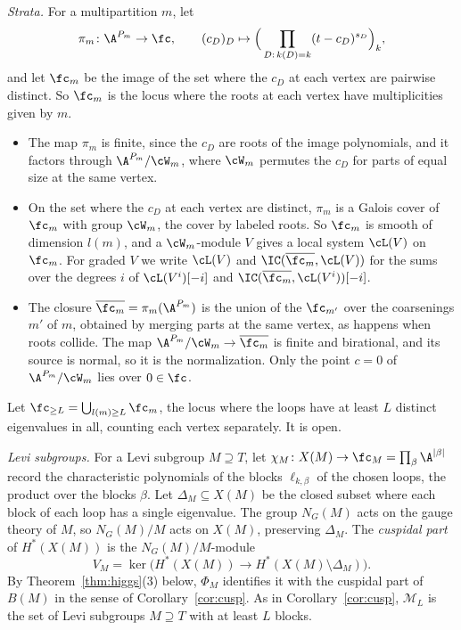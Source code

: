 \documentclass[11pt]{amsart}
\begin{document}
\emph{Strata.}  For a multipartition $m$, let
\[
 \pi_m\colon\A^{P_m}\to\fc,\qquad(c_D)_D\mapsto\Big(\prod_{D:\,k(D)=k}(t-c_D)^{s_D}\Big)_k ,
\]
and let $\fc_m$ be the image of the set where the $c_D$ at each vertex are
pairwise distinct.  So $\fc_m$ is the locus where the roots at each vertex
have multiplicities given by $m$.
\begin{itemize}[leftmargin=2em]
\item The map $\pi_m$ is finite, since the $c_D$ are roots of the image
polynomials, and it factors through $\A^{P_m}/\cW_m$, where $\cW_m$ permutes
the $c_D$ for parts of equal size at the same vertex.
\item On the set where the $c_D$ at each vertex are distinct, $\pi_m$ is a
Galois cover of $\fc_m$ with group $\cW_m$, the cover by labeled roots.  So
$\fc_m$ is smooth of dimension $l(m)$, and a $\cW_m$-module $V$ gives a local
system $\cL(V)$ on $\fc_m$.  For graded $V$ we write $\cL(V)$ and
$\IC(\overline{\fc_m},\cL(V))$ for the sums over the degrees $i$ of
$\cL(V^i)[-i]$ and $\IC(\overline{\fc_m},\cL(V^i))[-i]$.
\item The closure $\overline{\fc_m}=\pi_m(\A^{P_m})$ is the union of the
$\fc_{m'}$ over the coarsenings $m'$ of $m$, obtained by merging parts at the
same vertex, as happens when roots collide.  The map
$\A^{P_m}/\cW_m\to\overline{\fc_m}$ is finite and birational, and its source
is normal, so it is the normalization.  Only the point $c=0$ of
$\A^{P_m}/\cW_m$ lies over $0\in\fc$.
\end{itemize}
Let $\fc_{\ge L}=\bigcup_{l(m)\ge L}\fc_m$, the locus where the loops have at
least $L$ distinct eigenvalues in all, counting each vertex separately.  It is
open.

\emph{Levi subgroups.}  For a Levi subgroup $M\supseteq T$, let
$\chi_M\colon X(M)\to\fc_M=\prod_\beta\A^{|\beta|}$ record the characteristic
polynomials of the blocks $\ell_{k,\beta}$ of the chosen loops, the product
over the blocks $\beta$.  Let $\Delta_M\subseteq X(M)$ be the closed subset
where each block of each loop has a single eigenvalue.  The group $N_G(M)$
acts on the gauge theory of $M$, so $N_G(M)/M$ acts on $X(M)$, preserving
$\Delta_M$.  The \emph{cuspidal part} of $H^*(X(M))$ is the
$N_G(M)/M$-module
\[
 V_M=\ker\big(H^*(X(M))\to H^*(X(M)\setminus\Delta_M)\big).
\]
By Theorem~\ref{thm:higgs}(3) below, $\Phi_M$ identifies it with the cuspidal
part of $B(M)$ in the sense of Corollary~\ref{cor:cusp}.
As in Corollary~\ref{cor:cusp}, $\mathcal M_L$ is the set of Levi subgroups
$M\supseteq T$ with at least $L$ blocks.
\end{document}
